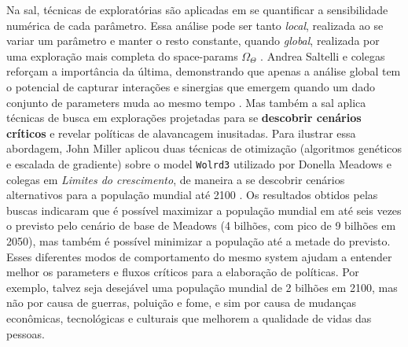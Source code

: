 \documentclass[./main.tex]{subfiles}
\begin{document}
\par Na \gls{sal}, técnicas de exploratórias são aplicadas em se quantificar a sensibilidade numérica de cada parâmetro. Essa análise pode ser tanto \textit{local}, realizada ao se variar um parâmetro e manter o resto constante, quando \textit{global}, realizada por uma exploração mais completa do \gls{space-params} $\Omega_{\Theta}$ \cite{Saltelli2006}. Andrea Saltelli e colegas reforçam a importância da última, demonstrando que apenas a análise global tem o potencial de capturar interações e sinergias que emergem quando um dado conjunto de \gls{parameters} muda ao mesmo tempo \cite{Saltelli2019}.  Mas também a \gls{sal} aplica técnicas de busca em explorações projetadas para se \textbf{descobrir cenários críticos} e revelar políticas de alavancagem inusitadas. Para ilustrar essa abordagem, John Miller aplicou duas técnicas de otimização (algoritmos genéticos e escalada de gradiente) sobre o \gls{model} \texttt{Wolrd3} utilizado por Donella Meadows e colegas em \textit{Limites do crescimento}, de maneira a se descobrir cenários alternativos para a população mundial até 2100 \cite{miller1998}. Os resultados obtidos pelas buscas indicaram que é possível maximizar a população mundial em até seis vezes o previsto pelo cenário de base de Meadows (4 bilhões, com pico de 9 bilhões em 2050), mas também é possível minimizar a população até a metade do previsto. Esses diferentes modos de comportamento do mesmo \gls{system} ajudam a entender melhor os \gls{parameters} e fluxos críticos para a elaboração de políticas. Por exemplo, talvez seja desejável uma população mundial de 2 bilhões em 2100, mas não por causa de guerras, poluição e fome, e sim por causa de mudanças econômicas, tecnológicas e culturais que melhorem a qualidade de vidas das pessoas. 
\end{document}
